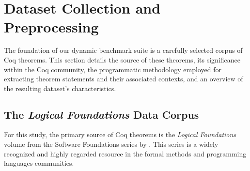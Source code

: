 
\section{Dataset Collection and Preprocessing}
\label{sec:dataset_collection_preprocessing}

The foundation of our dynamic benchmark suite is a carefully selected corpus of Coq theorems. This section details the source of these theorems, its significance within the Coq community, the programmatic methodology employed for extracting theorem statements and their associated contexts, and an overview of the resulting dataset's characteristics.

\subsection{The \emph{Logical Foundations} Data Corpus}
\label{sec:data_corpus}

For this study, the primary source of Coq theorems is the \emph{Logical Foundations} volume from the Software Foundations series by \citet{PierceSF:LF2024}. This series is a widely recognized and highly regarded resource in the formal methods and programming languages communities.

